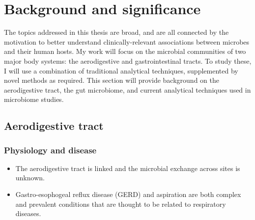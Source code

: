 \documentclass[12pt]{article}
\begin{document}
\section{Background and significance}

The topics addressed in this thesis are broad, and are all connected by
the motivation to better understand
clinically-relevant associations between microbes and their human hosts.
My work will focus on the microbial communities of two major body systems:
the aerodigestive and gastrointestinal tracts. To study these, I will 
use a combination of traditional analytical techniques, supplemented by 
novel methods as required. This section will provide background on
the aerodigestive tract, the gut microbiome, and current analytical techniques 
used in microbiome studies. 

\subsection{Aerodigestive tract}

\subsubsection{Physiology and disease}

\begin{itemize}
\item The aerodigestive tract is linked and the microbial exchange across
sites is unknown.
\item Gastro-esophogeal reflux disease (GERD) and aspiration are both complex and prevalent conditions that are thought to be related to respiratory diseases.
\end{itemize}
\end{document}
